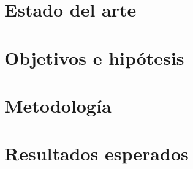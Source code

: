 \documentclass{article}
\begin{document}
  \section{Estado del arte}
  \section{Objetivos e hipótesis}
  \section{Metodología}
  \section{Resultados esperados}

  \printbibliography
\end{document}
